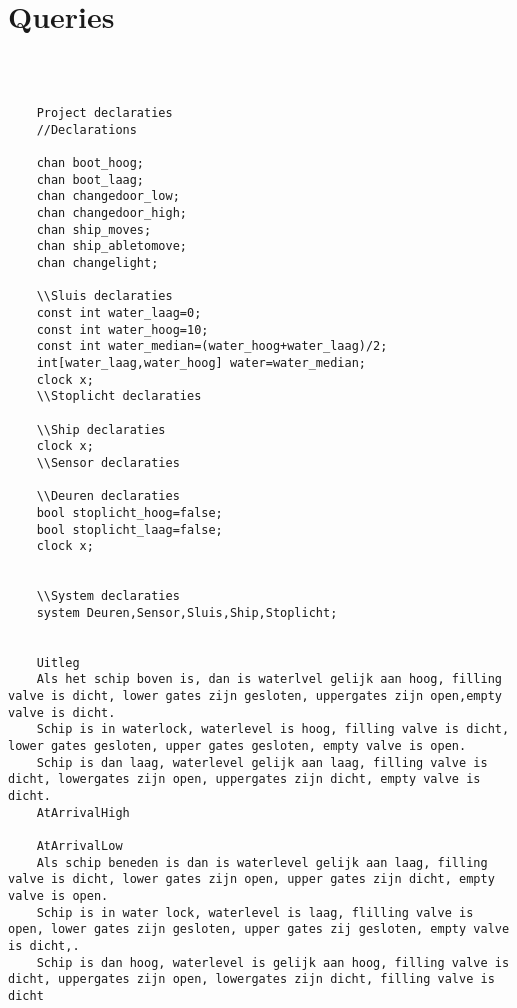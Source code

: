  
 \chapter{Queries}
 \begin{verbatim}
 	
 	
 	
 	Project declaraties
 	//Declarations
 	
 	chan boot_hoog;
 	chan boot_laag;
 	chan changedoor_low;
 	chan changedoor_high;
 	chan ship_moves;
 	chan ship_abletomove;
 	chan changelight;
 	
 	\\Sluis declaraties
 	const int water_laag=0;
 	const int water_hoog=10;
 	const int water_median=(water_hoog+water_laag)/2;
 	int[water_laag,water_hoog] water=water_median;
 	clock x;
 	\\Stoplicht declaraties
 	
 	\\Ship declaraties
 	clock x;
 	\\Sensor declaraties
 	
 	\\Deuren declaraties
 	bool stoplicht_hoog=false;
 	bool stoplicht_laag=false;
 	clock x;
 	
 	
 	\\System declaraties
 	system Deuren,Sensor,Sluis,Ship,Stoplicht;
 	
 	
 	Uitleg
 	Als het schip boven is, dan is waterlvel gelijk aan hoog, filling valve is dicht, lower gates zijn gesloten, uppergates zijn open,empty valve is dicht. 
 	Schip is in waterlock, waterlevel is hoog, filling valve is dicht, lower gates gesloten, upper gates gesloten, empty valve is open. 
 	Schip is dan laag, waterlevel gelijk aan laag, filling valve is dicht, lowergates zijn open, uppergates zijn dicht, empty valve is dicht.
 	AtArrivalHigh
 	
 	AtArrivalLow
 	Als schip beneden is dan is waterlevel gelijk aan laag, filling valve is dicht, lower gates zijn open, upper gates zijn dicht, empty valve is open. 
 	Schip is in water lock, waterlevel is laag, flilling valve is open, lower gates zijn gesloten, upper gates zij gesloten, empty valve is dicht,. 
 	Schip is dan hoog, waterlevel is gelijk aan hoog, filling valve is dicht, uppergates zijn open, lowergates zijn dicht, filling valve is dicht
 	
 	
 	
 \end{verbatim}
 
 
 
